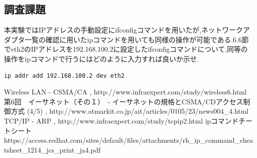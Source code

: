 \documentclass[a4j]{celb-report}
\begin{document}
\subsection{調査課題}
本実験ではIPアドレスの手動設定にifconfigコマンドを用いたが,ネットワークアダプタ一覧の確認に用いたipコマンドを用いても同様の操作が可能である.6.6節でeth2のIPアドレスを192.168.100.2に設定したifconfigコマンドについて,同等の操作をipコマンドで行うにはどのように入力すれば良いか示せ.
\begin{lstlisting}[caption=ipコマンド]
ip addr add 192.168.100.2 dev eth2
\end{lstlisting}
\newpage
\begin{thebibliography}{9}
 Wireless LAN - CSMA/CA , http://www.infraexpert.com/study/wireless6.html
 第6回　イーサネット（その１）　- イーサネットの規格とCSMA/CDアクセス制御方式 (4/5) , http://www.atmarkit.co.jp/ait/articles/0105/23/news004\_4.html
 TCP/IP - ARP , http://www.infraexpert.com/study/tcpip2.html
 ipコマンドチートシート https://access.redhat.com/sites/default/files/attachments/rh\_ip\_command\_cheatsheet\_1214\_jcs\_print\_ja4.pdf
\end{thebibliography}
%
\end{document}
